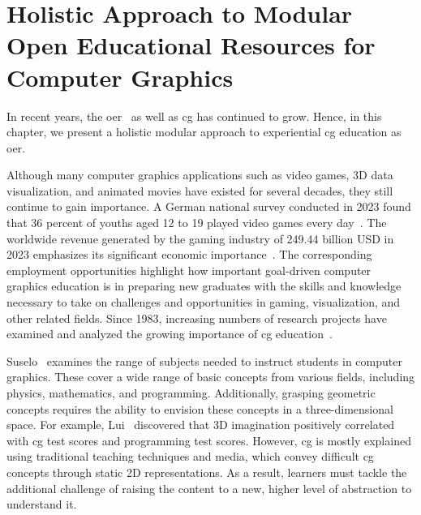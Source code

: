 \chapter{Holistic Approach to Modular Open Educational Resources for Computer Graphics\label{chap:ExGoer}} %
In recent years, the \acrfull{oer}~\cite{wiley:2014:oer} as well as \acrfull{cg} has continued to grow. Hence, in this chapter, we present a holistic modular approach to experiential \acrshort{cg} education as \acrshort{oer}.

Although many computer graphics applications such as video games, 3D data visualization, and animated movies have existed for several decades, they still continue to gain importance. A German national survey conducted in 2023 found that 36 percent of youths aged 12 to 19 played video games every day~\cite{jim:2023:studies}. 
The worldwide revenue generated by the gaming industry of 249.44 billion USD in 2023 emphasizes its significant economic importance~\cite{Statista-Market-Insights:2023:Videogames-worldwide}. The corresponding employment opportunities highlight how important goal-driven computer graphics education is in preparing new graduates with the skills and knowledge necessary to take on challenges and opportunities in gaming, visualization, and other related fields. Since 1983, increasing numbers of research projects have examined and analyzed the growing importance of \acrshort{cg} education~\cite{Balreira:2017:topics-cg-teaching}.

Suselo~\cite{Suselo:2019:problems-cg-teaching} examines the range of subjects needed to instruct students in computer graphics. These cover a wide range of basic concepts from various fields, including physics, mathematics, and programming. Additionally, grasping geometric concepts requires the ability to envision these concepts in a three-dimensional space. For example, Lui~\cite{Lui:2022:problems-cg-teaching} discovered that 3D imagination positively correlated with \acrshort{cg} test scores and programming test scores. However, \acrshort{cg} is mostly explained using traditional teaching techniques and media, which convey difficult \acrshort{cg} concepts through static 2D representations. As a result, learners must tackle the additional challenge of raising the content to a new, higher level of abstraction to understand it.

